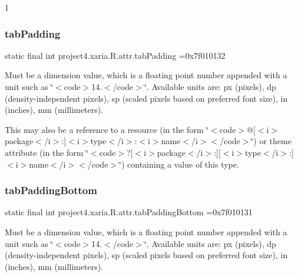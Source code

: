 1\mbox{\label{classproject4_1_1xaria_1_1R_1_1attr_aaa2954799b7ea4937b4a26e12cd4b3c3}} 
\subsubsection{\texorpdfstring{tab\+Padding}{tabPadding}}
{\footnotesize\ttfamily static final int project4.\+xaria.\+R.\+attr.\+tab\+Padding =0x7f010132\hspace{0.3cm}{\ttfamily [static]}}

Must be a dimension value, which is a floating point number appended with a unit such as \char`\"{}$<$code$>$14.\+5sp$<$/code$>$\char`\"{}. Available units are\+: px (pixels), dp (density-\/independent pixels), sp (scaled pixels based on preferred font size), in (inches), mm (millimeters). 

This may also be a reference to a resource (in the form \char`\"{}$<$code$>$@\mbox{[}$<$i$>$package$<$/i$>$\+:\mbox{]}$<$i$>$type$<$/i$>$\+:$<$i$>$name$<$/i$>$$<$/code$>$\char`\"{}) or theme attribute (in the form \char`\"{}$<$code$>$?\mbox{[}$<$i$>$package$<$/i$>$\+:\mbox{]}\mbox{[}$<$i$>$type$<$/i$>$\+:\mbox{]}$<$i$>$name$<$/i$>$$<$/code$>$\char`\"{}) containing a value of this type. \mbox{\label{classproject4_1_1xaria_1_1R_1_1attr_af675e4fcbded4ec33987a30faa6c7a72}} 
\subsubsection{\texorpdfstring{tab\+Padding\+Bottom}{tabPaddingBottom}}
{\footnotesize\ttfamily static final int project4.\+xaria.\+R.\+attr.\+tab\+Padding\+Bottom =0x7f010131\hspace{0.3cm}{\ttfamily [static]}}

Must be a dimension value, which is a floating point number appended with a unit such as \char`\"{}$<$code$>$14.\+5sp$<$/code$>$\char`\"{}. Available units are\+: px (pixels), dp (density-\/independent pixels), sp (scaled pixels based on preferred font size), in (inches), mm (millimeters). 

